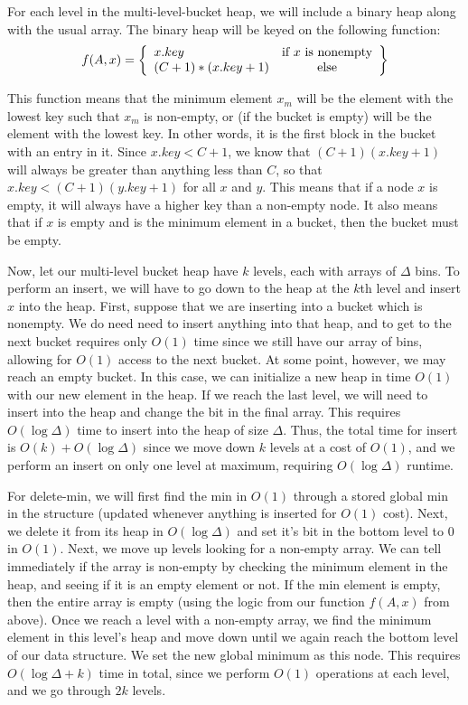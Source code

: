 \documentclass[psamsfonts]{amsart}
\newenvironment{sol}{\vspace{0.25cm}{\large \bfseries Solution:}}{\qedsymbol}
\begin{document}
\begin{sol}
For each level in the multi-level-bucket heap, we will include a binary heap along with the usual array. The binary heap will be keyed on the following function:
\begin{equation}
f(A,x) = \left\{ \begin{array}{l c}
x.key & \text{if $x$ is nonempty} \\
(C+1)*(x.key + 1) & \text{else}
\end{array} \right\}
\end{equation}

This function means that the minimum element $x_m$ will be the element with the lowest key such that $x_m$ is non-empty, or (if the bucket is empty) will be the element with the lowest key. In other words, it is the first block in the bucket with an entry in it. Since $x.key < C + 1$, we know that $(C+1)(x.key + 1)$ will always be greater than anything less than $C$, so that $x.key < (C+1)(y.key + 1)$ for all $x$ and $y$. This means that if a node $x$ is empty, it will always have a higher key than a non-empty node. It also means that if $x$ is empty and is the minimum element in a bucket, then the bucket must be empty.

Now, let our multi-level bucket heap have $k$ levels, each with arrays of $\Delta$ bins. To perform an insert, we will have to go down to the heap at the $k$th level and insert $x$ into the heap. First, suppose that we are inserting into a bucket which is nonempty. We do need need to insert anything into that heap, and to get to the next bucket requires only $O(1)$ time since we still have our array of bins, allowing for $O(1)$ access to the next bucket. At some point, however, we may reach an empty bucket. In this case, we can initialize a new heap in time $O(1)$ with our new element in the heap. If we reach the last level, we will need to insert into the heap and change the bit in the final array. This requires $O(\log \Delta)$ time to insert into the heap of size $\Delta$. Thus, the total time for insert is $O(k) + O(\log \Delta)$ since we move down $k$ levels at a cost of $O(1)$, and we perform an insert on only one level at maximum, requiring $O(\log \Delta)$ runtime. 

For delete-min, we will first find the min in $O(1)$ through a stored global min in the structure (updated whenever anything is inserted for $O(1)$ cost). Next, we delete it from its heap in $O(\log \Delta)$ and set it's bit in the bottom level to 0 in $O(1)$. Next, we move up levels looking for a non-empty array. We can tell immediately if the array is non-empty by checking the minimum element in the heap, and seeing if it is an empty element or not. If the min element is empty, then the entire array is empty (using the logic from our function $f(A,x)$ from above). Once we reach a level with a non-empty array, we find the minimum element in this level's heap and move down until we again reach the bottom level of our data structure. We set the new global minimum as this node. This requires $O(\log \Delta + k)$ time in total, since we perform $O(1)$ operations at each level, and we go through $2k$ levels. 


\end{sol}
\end{document}
